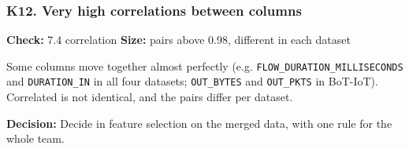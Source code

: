 \documentclass[10pt,a4paper]{article}
\newcommand{\meta}[2]{{\small\color{muted}\textbf{Check:} #1 \quad\textbar\quad \textbf{Size:} #2}}
\newcommand{\decision}[1]{\textcolor{accent}{\textbf{Decision:}} #1\par}
\newenvironment{problem}{\par\noindent\begin{minipage}{\linewidth}\setlength{\parskip}{4pt}}{\end{minipage}\par\bigskip}
\begin{document}
\begin{problem}
\subsubsection*{K12. Very high correlations between columns}
\meta{7.4 correlation}{pairs above 0.98, different in each dataset}

Some columns move together almost perfectly (e.g. \texttt{FLOW\_\allowbreak{}DURATION\_\allowbreak{}MILLISECONDS} and \texttt{DURATION\_\allowbreak{}IN} in all four datasets; \texttt{OUT\_\allowbreak{}BYTES} and \texttt{OUT\_\allowbreak{}PKTS} in BoT-IoT). Correlated is not identical, and the pairs differ per dataset.

\decision{Decide in feature selection on the merged data, with one rule for the whole team.}
\end{problem}
\end{document}
